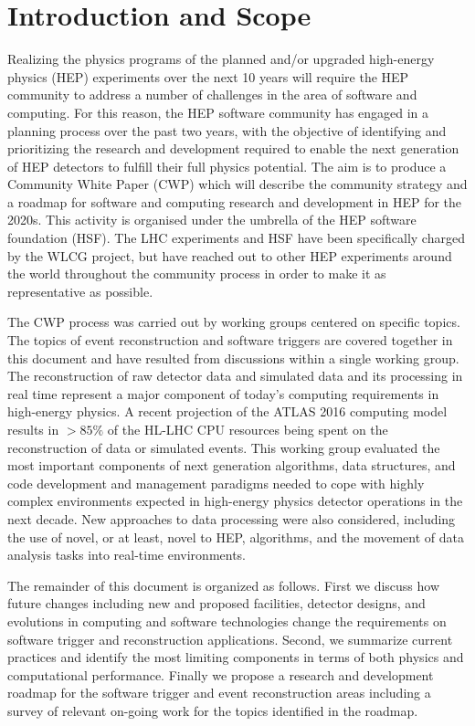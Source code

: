 \section{Introduction and Scope}

Realizing the physics programs of the planned and/or upgraded high-energy physics (HEP) experiments over the next 10 years will require the HEP community to address a number of 
challenges in the area of software and computing. For this reason, the HEP software community has engaged in a planning process over the past two years, with the objective of 
identifying and prioritizing the research and development required to enable the next generation of HEP detectors to fulfill their full physics potential. The aim is to produce 
a Community White Paper (CWP) \cite{HSF2017} which will describe the community strategy and a roadmap for software and computing research and development in HEP for the 2020s. 
This activity is organised under the umbrella of the HEP software foundation (HSF). The LHC experiments and HSF have been specifically charged by the WLCG project, 
but have reached out to other HEP experiments around the world throughout the community process in order to make it as representative as possible.

The CWP process was carried out by working groups centered on specific topics. The topics of event reconstruction and software triggers are covered together in 
this document and have resulted from discussions within a single working group. The reconstruction of raw detector data and simulated data and its processing in 
real time represent a major component of today's computing requirements in high-energy physics. A recent projection \cite{Campana2016} of the ATLAS 2016 computing model 
results in $>85\%$ of the HL-LHC CPU resources being spent on the reconstruction of data or simulated events. This working group evaluated the most important components 
of next generation algorithms, data structures, and code development and management paradigms needed to cope with highly complex environments expected in high-energy 
physics detector operations in the next decade. New approaches to data processing were also considered, including the use of novel, or at least, novel to HEP, algorithms, 
and the movement of data analysis tasks into real-time environments. 

The remainder of this document is organized as follows. First we discuss how future changes including new and proposed facilities, detector designs, and evolutions in 
computing and software technologies change the requirements on software trigger and reconstruction applications. Second, we summarize current practices and identify the 
most limiting components in terms of both physics and computational performance. Finally we propose a research and development roadmap for the software trigger and event 
reconstruction areas including a survey of relevant on-going work for the topics identified in the roadmap. 

